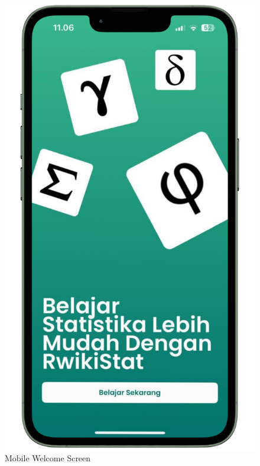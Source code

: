 \documentclass[conference,a4paper]{IEEEtran}
\begin{document}
\begin{figure}[htb]
  \centering
  \includegraphics [width=4 cm, height=8 cm]{images/welcome}
  \caption{Mobile Welcome Screen}
  \label{distribution}
\end{figure}






\end{document}
